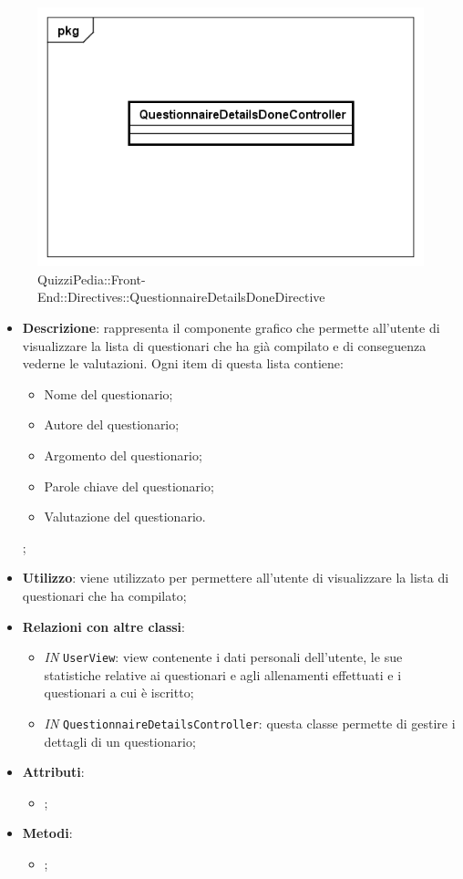 \begin{figure}[ht]
	\centering
	\includegraphics[scale=0.5,keepaspectratio]{UML/Classi/Front-End/QuizziPedia_Front-end_Directives_QuestionnaireDetailsDoneDirective.png}
	\caption{QuizziPedia::Front-End::Directives::QuestionnaireDetailsDoneDirective}
\end{figure} \FloatBarrier

\begin{itemize}
	\item \textbf{Descrizione}: rappresenta il componente grafico che permette all'utente di visualizzare la lista di questionari che ha già compilato e di conseguenza vederne le valutazioni. Ogni item di questa lista contiene:
	\begin{itemize}
		\item Nome del questionario;
		\item Autore del questionario;
		\item Argomento del questionario;
		\item Parole chiave del questionario;
		\item Valutazione del questionario.
	\end{itemize};
	\item \textbf{Utilizzo}: viene utilizzato per permettere all'utente di visualizzare la lista di questionari che ha compilato;
	\item \textbf{Relazioni con altre classi}: 
	\begin{itemize}
		\item \textit{IN} \texttt{UserView}: view contenente i dati personali dell'utente, le sue statistiche relative ai questionari e agli allenamenti effettuati e i questionari a cui è iscritto;
		\item \textit{IN} \texttt{QuestionnaireDetailsController}: questa classe permette di gestire i dettagli di un questionario;
	\end{itemize}
	\item \textbf{Attributi}: 
	\begin{itemize}
		\item ;
	\end{itemize}
	\item \textbf{Metodi}: 
	\begin{itemize}
		\item ;
	\end{itemize}
\end{itemize}

